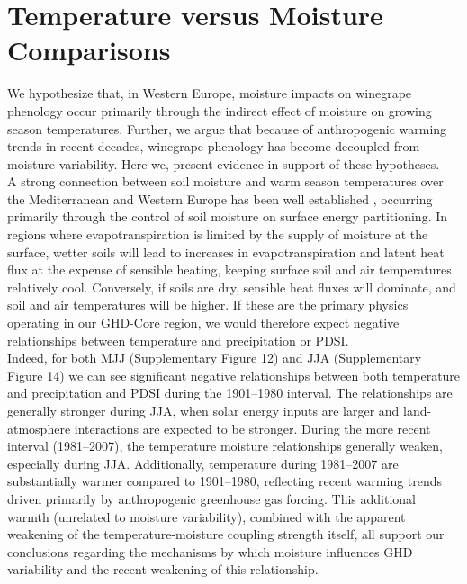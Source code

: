 \documentclass[12pt]{article}
\begin{document}
\section*{Temperature versus Moisture Comparisons}
\noindent We hypothesize that, in Western Europe, moisture impacts on winegrape phenology occur primarily through the indirect effect of moisture on growing season temperatures. Further, we argue that because of anthropogenic warming trends in recent decades, winegrape phenology has become decoupled from moisture variability. Here we, present evidence in support of these hypotheses.\\
\indent A strong connection between soil moisture and warm season temperatures over the Mediterranean and Western Europe has been well established \cite{Fischer2007,Miralles2014}, occurring primarily through the control of soil moisture on surface energy partitioning. In regions where evapotranspiration is limited by the supply of moisture at the surface, wetter soils will lead to increases in evapotranspiration and latent heat flux at the expense of sensible heating, keeping surface soil and air temperatures relatively cool. Conversely, if soils are dry, sensible heat fluxes will dominate, and soil and air temperatures will be higher. If these are the primary physics operating in our GHD-Core region, we would therefore expect negative relationships between temperature and precipitation or PDSI.\\
\indent Indeed, for both MJJ (Supplementary Figure 12) and JJA (Supplementary Figure 14) we can see significant negative relationships between both temperature and precipitation and PDSI during the 1901--1980 interval. The relationships are generally stronger during JJA, when solar energy inputs are larger and land-atmosphere interactions are expected to be stronger. During the more recent interval (1981--2007), the temperature moisture relationships generally weaken, especially during JJA. Additionally, temperature during 1981--2007 are substantially warmer compared to 1901--1980, reflecting recent warming trends driven primarily by anthropogenic greenhouse gas forcing. This additional warmth (unrelated to moisture variability), combined with the apparent weakening of the temperature-moisture coupling strength itself, all support our conclusions regarding the mechanisms by which moisture influences GHD variability and the recent weakening of this relationship.
\end{document}
